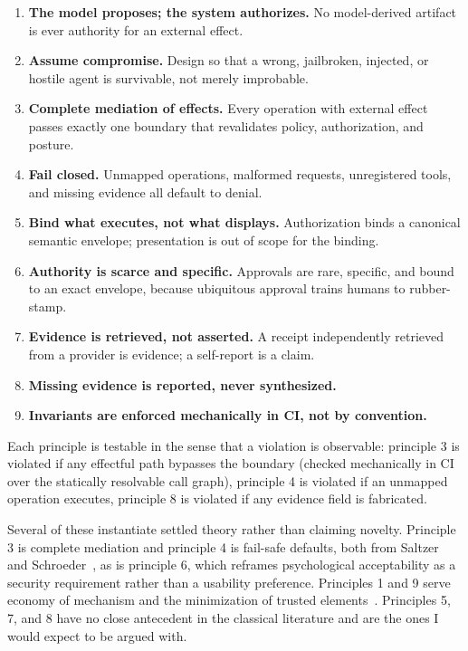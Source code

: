 \documentclass[11pt,letterpaper]{article}
\begin{document}
\begin{enumerate}[leftmargin=1.8em,itemsep=0.2em,topsep=0.3em]
  \item \textbf{The model proposes; the system authorizes.} No model-derived artifact is ever authority for an external effect.
  \item \textbf{Assume compromise.} Design so that a wrong, jailbroken, injected, or hostile agent is survivable, not merely improbable.
  \item \textbf{Complete mediation of effects.} Every operation with external effect passes exactly one boundary that revalidates policy, authorization, and posture.
  \item \textbf{Fail closed.} Unmapped operations, malformed requests, unregistered tools, and missing evidence all default to denial.
  \item \textbf{Bind what executes, not what displays.} Authorization binds a canonical semantic envelope; presentation is out of scope for the binding.
  \item \textbf{Authority is scarce and specific.} Approvals are rare, specific, and bound to an exact envelope, because ubiquitous approval trains humans to rubber-stamp.
  \item \textbf{Evidence is retrieved, not asserted.} A receipt independently retrieved from a provider is evidence; a self-report is a claim.
  \item \textbf{Missing evidence is reported, never synthesized.}
  \item \textbf{Invariants are enforced mechanically in CI, not by convention.}
\end{enumerate}

Each principle is testable in the sense that a violation is observable: principle 3 is violated if any effectful path bypasses the boundary (checked mechanically in CI over the statically resolvable call graph), principle 4 is violated if an unmapped operation executes, principle 8 is violated if any evidence field is fabricated.

Several of these instantiate settled theory rather than claiming novelty. Principle 3 is complete mediation and principle 4 is fail-safe defaults, both from Saltzer and Schroeder~\cite{saltzer1975}, as is principle 6, which reframes psychological acceptability as a security requirement rather than a usability preference. Principles 1 and 9 serve economy of mechanism and the minimization of trusted elements~\cite{saltzer1975,anderson1972}. Principles 5, 7, and 8 have no close antecedent in the classical literature and are the ones I would expect to be argued with.
\end{document}
